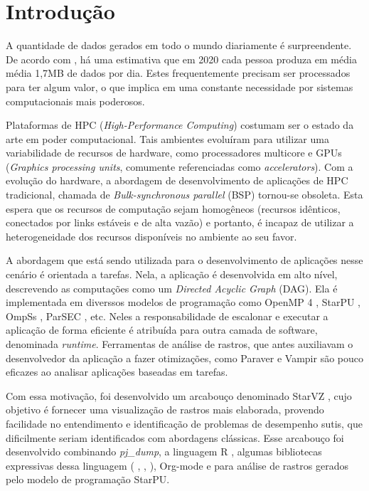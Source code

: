 \chapter{Introdução} \label{ch:intro}

A quantidade de dados gerados em todo o mundo diariamente é surpreendente. De 
acordo com \citet{ref:data_minute2}, há uma estimativa que em 2020 cada pessoa 
produza em média média 1,7MB de dados por dia. Estes frequentemente precisam 
ser processados para ter algum valor, o que implica em uma constante necessidade 
por sistemas computacionais mais poderosos.

Plataformas de HPC (\textit{High-Performance Computing}) costumam ser o estado 
da arte em poder computacional. Tais ambientes evoluíram para utilizar 
uma variabilidade de recursos de hardware, como processadores multicore e GPUs 
(\textit{Graphics processing units}, comumente referenciadas como 
\textit{accelerators}). Com a evolução do hardware, a abordagem de 
desenvolvimento de aplicações de HPC tradicional, chamada de 
\textit{Bulk-synchronous parallel} (BSP) tornou-se obsoleta. Esta espera que os 
recursos de computação sejam homogêneos (recursos idênticos, conectados por 
links estáveis e de alta vazão) e portanto, é incapaz de utilizar a 
heterogeneidade dos recursos disponíveis no ambiente ao seu favor. 

A abordagem que está sendo utilizada para o desenvolvimento de aplicações nesse 
cenário é orientada a tarefas. Nela, a aplicação é desenvolvida em alto nível, 
descrevendo as computações como um \textit{Directed Acyclic Graph} (DAG). Ela é 
implementada em diverssos modelos de programação como OpenMP 4 
\cite{ref:openmp4}, StarPU \cite{ref:starpu}, OmpSs \cite{ref:ompss}, 
ParSEC \cite{ref:parsec}, etc. Neles a responsabilidade de 
escalonar e executar a aplicação de forma eficiente é atribuída para outra 
camada de software, denominada \textit{runtime}. Ferramentas de análise de 
rastros, que antes auxiliavam o desenvolvedor da aplicação a fazer 
otimizações, como Paraver \cite{ref:paraver} e Vampir \cite{ref:vampir} são 
pouco eficazes ao analisar aplicações baseadas em tarefas.

Com essa motivação, foi desenvolvido um arcabouço denominado StarVZ 
\cite{ref:starvz}, cujo objetivo é fornecer uma visualização de rastros mais 
elaborada, provendo facilidade no entendimento e identificação de problemas de 
desempenho sutis, que dificilmente seriam identificados com abordagens 
clássicas. Esse arcabouço foi desenvolvido combinando \textit{pj\_dump},  
a linguagem R \cite{ref:rlanguage}, algumas bibliotecas expressivas dessa 
linguagem ( \cite{ref:ggplot2},  
\cite{ref:lpsolve},  \cite{ref:tidyverse}), Org-mode 
\cite{ref:org-mode} e  para análise de rastros gerados pelo 
modelo de programação StarPU.

